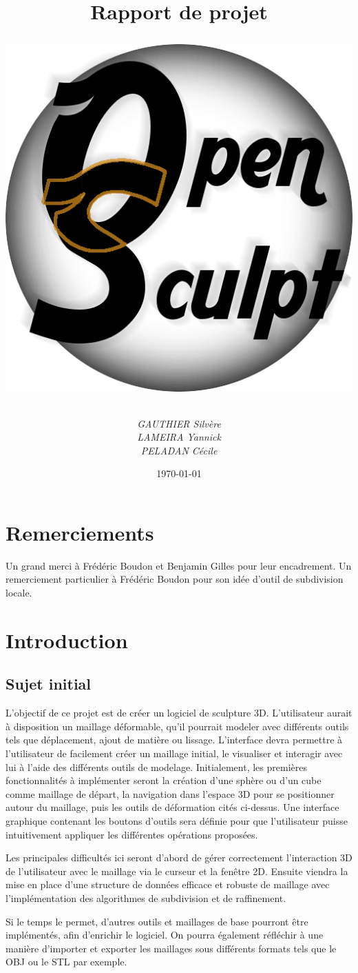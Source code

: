 \documentclass[a4paper]{memoir}
\title{
	\textbf{Rapport de projet}
	\bigskip
	\begin{center}
		\includegraphics[scale=0.25]{img/OpenSculpt.png}
	\end{center}
	\bigskip
}
\author{\emph{GAUTHIER Silvère}\\\emph{LAMEIRA Yannick}\\\emph{PELADAN Cécile}}
\date{\today}
\begin{document}
	\maketitle
	\newpage
	\tableofcontents

	\chapter{Remerciements}

		Un grand merci à Frédéric Boudon et Benjamin Gilles pour leur encadrement.
		Un remerciement particulier à Frédéric Boudon pour son idée d'outil de subdivision locale.

	\chapter{Introduction}
		
		\section{Sujet initial}
			L'objectif de ce projet est de créer un logiciel de sculpture 3D. L'utilisateur aurait à disposition un maillage déformable, qu'il pourrait 
			modeler avec différents outils tels que déplacement, ajout de matière ou lissage. L'interface devra permettre à l'utilisateur de facilement 
			créer un maillage initial, le visualiser et interagir avec lui à l'aide des différents outils de modelage. Initialement, les premières 
			fonctionnalités à implémenter seront la création d'une sphère ou d'un cube comme maillage de départ, la navigation dans l'espace 3D pour se 
			positionner autour du maillage, puis les outils de déformation cités ci-dessus. Une interface graphique contenant les boutons d'outils sera 
			définie pour que l'utilisateur puisse intuitivement appliquer les différentes opérations proposées.

			Les principales difficultés ici seront d'abord de gérer correctement l'interaction 3D de l'utilisateur avec le maillage via le curseur et la 
			fenêtre 2D. Ensuite viendra la mise en place d'une structure de données efficace et robuste de maillage avec l'implémentation des algorithmes 
			de subdivision et de raffinement.

			Si le temps le permet, d'autres outils et maillages de base pourront être implémentés, afin d'enrichir le logiciel. On pourra également 
			réfléchir à une manière d'importer et exporter les maillages sous différents formats tels que le OBJ ou le STL par exemple.
\end{document}
